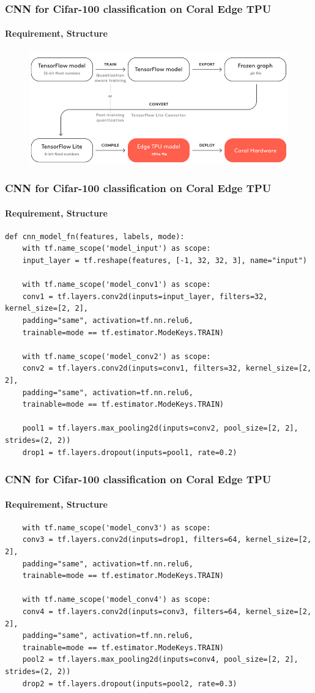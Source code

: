 \documentclass{beamer}
\begin{document}
\begin{frame}[fragile]
\frametitle{CNN for Cifar-100 classification on Coral Edge TPU}
\framesubtitle{Requirement, Structure}
	\begin{figure}
		\centering
		\includegraphics[scale=0.4]{pictures/passi_coral}
	\end{figure}
\end{frame}

\begin{frame}[fragile]
\frametitle{CNN for Cifar-100 classification on Coral Edge TPU}
\framesubtitle{Requirement, Structure}
\begin{lstlisting}
def cnn_model_fn(features, labels, mode):
    with tf.name_scope('model_input') as scope:
    input_layer = tf.reshape(features, [-1, 32, 32, 3], name="input")
    
    with tf.name_scope('model_conv1') as scope:
    conv1 = tf.layers.conv2d(inputs=input_layer, filters=32, kernel_size=[2, 2],
    padding="same", activation=tf.nn.relu6,
    trainable=mode == tf.estimator.ModeKeys.TRAIN)
    
    with tf.name_scope('model_conv2') as scope:
    conv2 = tf.layers.conv2d(inputs=conv1, filters=32, kernel_size=[2, 2],
    padding="same", activation=tf.nn.relu6,
    trainable=mode == tf.estimator.ModeKeys.TRAIN)
    
    pool1 = tf.layers.max_pooling2d(inputs=conv2, pool_size=[2, 2], strides=(2, 2))
    drop1 = tf.layers.dropout(inputs=pool1, rate=0.2)
\end{lstlisting}
\end{frame}

\begin{frame}[fragile]
\frametitle{CNN for Cifar-100 classification on Coral Edge TPU}
\framesubtitle{Requirement, Structure}
\begin{lstlisting}
    with tf.name_scope('model_conv3') as scope:
    conv3 = tf.layers.conv2d(inputs=drop1, filters=64, kernel_size=[2, 2],
    padding="same", activation=tf.nn.relu6,
    trainable=mode == tf.estimator.ModeKeys.TRAIN)
    
    with tf.name_scope('model_conv4') as scope:
    conv4 = tf.layers.conv2d(inputs=conv3, filters=64, kernel_size=[2, 2],
    padding="same", activation=tf.nn.relu6,
    trainable=mode == tf.estimator.ModeKeys.TRAIN)
    pool2 = tf.layers.max_pooling2d(inputs=conv4, pool_size=[2, 2], strides=(2, 2))
    drop2 = tf.layers.dropout(inputs=pool2, rate=0.3)
\end{lstlisting}
\end{frame}
\end{document}
